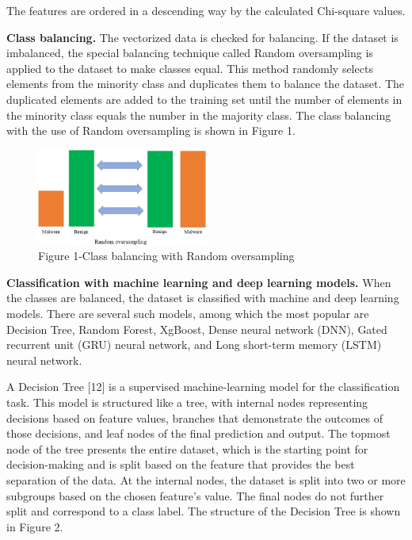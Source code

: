 The features are ordered in a descending way by the calculated
Chi-square values.

{\bfseries Class balancing.} The vectorized data is checked for balancing.
If the dataset is imbalanced, the special balancing technique called
Random oversampling is applied to the dataset to make classes equal.
This method randomly selects elements from the minority class and
duplicates them to balance the dataset. The duplicated elements are
added to the training set until the number of elements in the minority
class equals the number in the majority class. The class balancing with
the use of Random oversampling is shown in Figure 1.

\begin{figure}[H]
	\centering
	\includegraphics[width=0.5\textwidth]{media/ict/image38}
	\caption*{Figure 1-Class balancing with Random oversampling}
\end{figure}

{\bfseries Classification with machine learning and deep learning models.}
When the classes are balanced, the dataset is classified with machine
and deep learning models. There are several such models, among which the
most popular are Decision Tree, Random Forest, XgBoost, Dense neural
network (DNN), Gated recurrent unit (GRU) neural network, and Long
short-term memory (LSTM) neural network.

A Decision Tree {[}12{]} is a supervised machine-learning model for the
classification task. This model is structured like a tree, with internal
nodes representing decisions based on feature values, branches that
demonstrate the outcomes of those decisions, and leaf nodes of the final
prediction and output. The topmost node of the tree presents the entire
dataset, which is the starting point for decision-making and is split
based on the feature that provides the best separation of the data. At
the internal nodes, the dataset is split into two or more subgroups
based on the chosen feature's value. The final nodes do not further
split and correspond to a class label. The structure of the Decision
Tree is shown in Figure 2.

